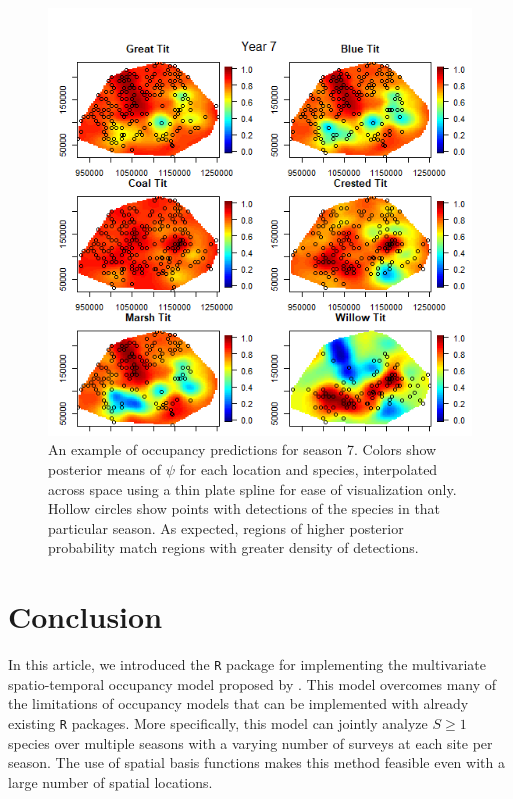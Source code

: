 \begin{figure}[ht]
  \centering
  \includegraphics[width=5.5in]{psi7.png}
  \caption{An example of occupancy predictions for season 7.  Colors show posterior means of $\psi$ for each location and species, interpolated across space using a thin plate spline for ease of visualization only.  Hollow circles show points with detections of the species in that particular season.  As expected, regions of higher posterior probability match regions with greater density of detections.}
  \label{figure:psi7}
\end{figure}

\section{Conclusion}

In this article, we introduced the \texttt{R} package  for implementing the multivariate spatio-temporal occupancy model proposed by \citet{hepler2021spatiotemporal}. This model overcomes many of the limitations of occupancy models that can be implemented with already existing \texttt{R} packages. More specifically, this model can jointly analyze $S \geq 1$ species over multiple seasons with a varying number of surveys at each site per season. The use of spatial basis functions makes this method feasible even with a large number of spatial locations. 

